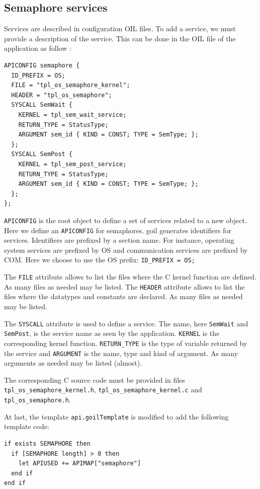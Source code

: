 \documentclass[11pt]{article}
\begin{document}
\subsection{Semaphore services}

Services are described in configuration OIL files. To add a service, we must provide a description of the service. This can be done in the OIL file of the application as follow :

\begin{lstlisting}
APICONFIG semaphore {
  ID_PREFIX = OS;
  FILE = "tpl_os_semaphore_kernel";
  HEADER = "tpl_os_semaphore";
  SYSCALL SemWait {
    KERNEL = tpl_sem_wait_service;
    RETURN_TYPE = StatusType;
    ARGUMENT sem_id { KIND = CONST; TYPE = SemType; };
  };
  SYSCALL SemPost {
    KERNEL = tpl_sem_post_service;
    RETURN_TYPE = StatusType;
    ARGUMENT sem_id { KIND = CONST; TYPE = SemType; };
  };
};
\end{lstlisting}

\lstinline{APICONFIG} is the root object to define a set of services related to a new object. Here we define an \lstinline{APICONFIG} for semaphores. goil generates identifiers for services. Identifiers are prefixed by a section name. For instance, operating system services are prefixed by OS and communication services are prefixed by COM. Here we choose to use the OS prefix: \lstinline{ID_PREFIX = OS;}

The \lstinline{FILE} attribute allows to list the files where the C kernel function are defined. As many files as needed may be listed. The \lstinline{HEADER} attribute allows to list the files where the datatypes and constants are declared. As many files as needed may be listed. 

The \lstinline{SYSCALL} attribute is used to define a service. The name, here \lstinline{SemWait} and \lstinline{SemPost}, is the service name as seen by the application. \lstinline{KERNEL} is the corresponding kernel function. \lstinline{RETURN_TYPE} is the type of variable returned by the service and \lstinline{ARGUMENT} is the name, type and kind of argument. As many arguments as needed may be listed (almost).

The corresponding C source code must be provided in files \lstinline{tpl_os_semaphore_kernel.h}, \lstinline{tpl_os_semaphore_kernel.c} and \lstinline{tpl_os_semaphore.h}.

At last, the template \lstinline{api.goilTemplate} is modified to add the following template code:
\begin{lstlisting}
if exists SEMAPHORE then
  if [SEMAPHORE length] > 0 then
    let APIUSED += APIMAP["semaphore"]
  end if
end if
\end{lstlisting}
\end{document}
